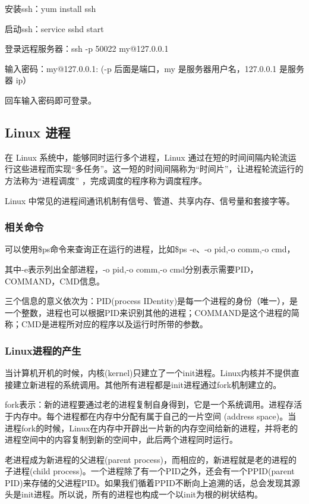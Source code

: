 \documentclass[UTF8]{article}%
\begin{document}
安装ssh：yum install ssh

启动ssh：service sshd start

登录远程服务器：ssh -p 50022 my@127.0.0.1

输入密码：my@127.0.0.1:
(-p 后面是端口，my 是服务器用户名，127.0.0.1 是服务器 ip）

回车输入密码即可登录。

\subsection{Linux 进程}

在 Linux 系统中，能够同时运行多个进程，Linux 通过在短的时间间隔内轮流运行这些进程而实现“多任务”。这一短的时间间隔称为“时间片”，让进程轮流运行的方法称为“进程调度” ，完成调度的程序称为调度程序。

Linux 中常见的进程间通讯机制有信号、管道、共享内存、信号量和套接字等。

\subsubsection{相关命令}

可以使用\$ps命令来查询正在运行的进程，比如\$ps -e、-o pid,-o comm,-o cmd，

其中-e表示列出全部进程，-o pid,-o comm,-o cmd分别表示需要PID，COMMAND，CMD信息。

三个信息的意义依次为：PID(process IDentity)是每一个进程的身份（唯一），是一个整数，进程也可以根据PID来识别其他的进程；COMMAND是这个进程的简称；CMD是进程所对应的程序以及运行时所带的参数。

\subsubsection{Linux进程的产生}

当计算机开机的时候，内核(kernel)只建立了一个init进程。Linux内核并不提供直接建立新进程的系统调用。其他所有进程都是init进程通过fork机制建立的。

fork表示：新的进程要通过老的进程复制自身得到，它是一个系统调用。进程存活于内存中。每个进程都在内存中分配有属于自己的一片空间 (address space)。当进程fork的时候，Linux在内存中开辟出一片新的内存空间给新的进程，并将老的进程空间中的内容复制到新的空间中，此后两个进程同时运行。

老进程成为新进程的父进程(parent process)，而相应的，新进程就是老的进程的子进程(child process)。一个进程除了有一个PID之外，还会有一个PPID(parent PID)来存储的父进程PID。如果我们循着PPID不断向上追溯的话，总会发现其源头是init进程。所以说，所有的进程也构成一个以init为根的树状结构。
\end{document}
